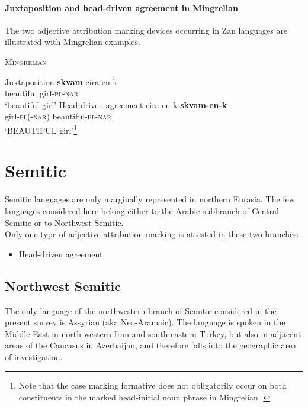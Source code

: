 \paragraph{Juxtaposition and head-driven agreement in Mingrelian}
The two adjective attribution marking devices occurring in Zan languages are illustrated with Mingrelian examples.
\begin{exe}
\ex \textsc{Mingrelian} \citep[361–364]{harris1991b}
\begin{xlist}
\ex	Juxtaposition \label{mingrelian juxt}
\gll	\textbf{skvam} cira-en-k\\
	beautiful girl-\textsc{pl}-\textsc{nar}\\
\glt	‘beautiful girl’%
\ex 	Head-driven agreement \label{mingrelian agr}
\gll	cira-en-k \textbf{skvam-en-k}\\
	girl-\textsc{pl}(-\textsc{nar}) beautiful-\textsc{pl}-\textsc{nar}\\
\glt	‘BEAUTIFUL girl’\footnote{Note that the case marking formative does not obligatorily occur on both constituents in the marked head-initial noun phrase in Mingrelian \citep[363–364]{harris1991b}.}%
\end{xlist}
\end{exe}

\section{Semitic}
Semitic languages are only marginally represented in northern Eurasia. The few languages considered here belong either to the Arabic subbranch of Central Semitic or to Northwest Semitic.\\

\noindent Only one type of adjective attribution marking is attested in these two branches:
\begin{itemize}
\item Head-driven agreement.
\end{itemize}

\subsection{Northwest Semitic}
The only language of the northwestern branch of Semitic considered in the present survey is Assyrian (aka Neo-Aramaic). The language is spoken in the Middle-East in north-western Iran and south-eastern Turkey, but also in adjacent areas of the Caucasus in Azerbaijan, and therefore falls into the geographic area of investigation.


